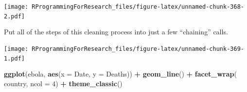 \documentclass[]{book}
\makeatletter
\newenvironment{Shaded}{\begin{snugshade}}{\end{snugshade}}
\newcommand{\KeywordTok}[1]{\textcolor[rgb]{0.13,0.29,0.53}{\textbf{#1}}}
\newcommand{\DataTypeTok}[1]{\textcolor[rgb]{0.13,0.29,0.53}{#1}}
\newcommand{\DecValTok}[1]{\textcolor[rgb]{0.00,0.00,0.81}{#1}}
\newcommand{\StringTok}[1]{\textcolor[rgb]{0.31,0.60,0.02}{#1}}
\newcommand{\OperatorTok}[1]{\textcolor[rgb]{0.81,0.36,0.00}{\textbf{#1}}}
\newcommand{\NormalTok}[1]{#1}
\newenvironment{kframe}{%
\medskip{}
\setlength{\fboxsep}{.8em}
 \def\at@end@of@kframe{}%
 \ifinner\ifhmode%
  \def\at@end@of@kframe{\end{minipage}}%
  \begin{minipage}{\columnwidth}%
 \fi\fi%
 \def\FrameCommand##1{\hskip\@totalleftmargin \hskip-\fboxsep
 \colorbox{shadecolor}{##1}\hskip-\fboxsep
     \hskip-\linewidth \hskip-\@totalleftmargin \hskip\columnwidth}%
 \MakeFramed {\advance\hsize-\width
   \@totalleftmargin\z@ \linewidth\hsize
   \@setminipage}}%
 {\par\unskip\endMakeFramed%
 \at@end@of@kframe}
\renewenvironment{Shaded}{\begin{kframe}}{\end{kframe}}
\theoremstyle{definition}
\theoremstyle{definition}
\theoremstyle{definition}
\theoremstyle{remark}
\makeatother
\begin{document}
\texttt{[image: RProgrammingForResearch\_files/figure-latex/unnamed-chunk-368-2.pdf]}

Put all of the steps of this cleaning process into just a few
``chaining'' calls.

\begin{Shaded}
\end{Shaded}

\texttt{[image: RProgrammingForResearch\_files/figure-latex/unnamed-chunk-369-1.pdf]}

\begin{Shaded}
\begin{Highlighting}[]
\KeywordTok{ggplot}\NormalTok{(ebola, }\KeywordTok{aes}\NormalTok{(}\DataTypeTok{x =}\NormalTok{ Date, }\DataTypeTok{y =}\NormalTok{ Deaths)) }\OperatorTok{+}\StringTok{ }
\StringTok{        }\KeywordTok{geom_line}\NormalTok{() }\OperatorTok{+}\StringTok{ }
\StringTok{        }\KeywordTok{facet_wrap}\NormalTok{(}\OperatorTok{~}\StringTok{ }\NormalTok{country, }\DataTypeTok{ncol =} \DecValTok{4}\NormalTok{) }\OperatorTok{+}\StringTok{ }
\StringTok{        }\KeywordTok{theme_classic}\NormalTok{()}
\end{Highlighting}
\end{Shaded}
\end{document}
